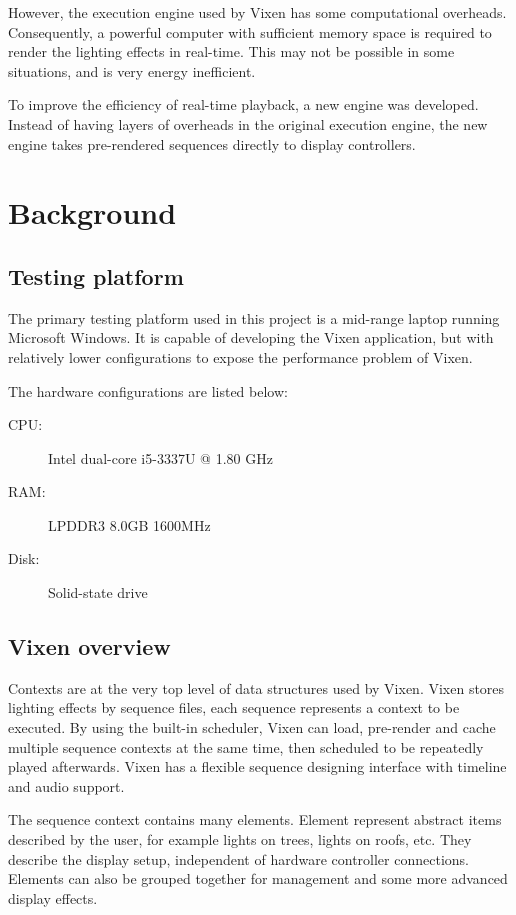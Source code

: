 \documentclass[journal]{IEEEtran}
\begin{document}
However, the execution engine used by Vixen has some computational overheads. Consequently, a powerful computer with sufficient memory space is required to render the lighting effects in real-time. This may not be possible in some situations, and is very energy inefficient.

To improve the efficiency of real-time playback, a new engine was developed. Instead of having layers of overheads in the original execution engine, the new engine takes pre-rendered sequences directly to display controllers.

\section{Background}

\subsection{Testing platform}

The primary testing platform used in this project is a mid-range laptop running Microsoft Windows. It is capable of developing the Vixen application, but with relatively lower configurations to expose the performance problem of Vixen.

The hardware configurations are listed below:

\begin{description}
	\item[CPU:]	Intel dual-core i5-3337U @ 1.80 GHz
	\item[RAM:]	LPDDR3 8.0GB 1600MHz
	\item[Disk:]	Solid-state drive
\end{description}

\subsection{Vixen overview}

Contexts are at the very top level of data structures used by Vixen. Vixen stores lighting effects by sequence files, each sequence represents a context to be executed. By using the built-in scheduler, Vixen can load, pre-render and cache multiple sequence contexts at the same time, then scheduled to be repeatedly played afterwards. Vixen has a flexible sequence designing interface with timeline and audio support.

The sequence context contains many elements. Element represent abstract items described by the user, for example lights on trees, lights on roofs, etc. They describe the display setup, independent of hardware controller connections. Elements can also be grouped together for management and some more advanced display effects.
\end{document}
